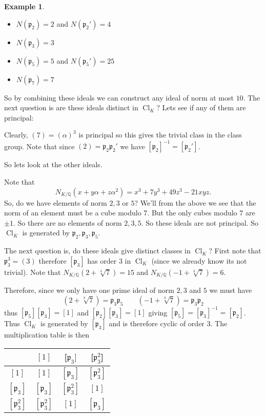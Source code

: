 \documentclass[11pt,a4paper]{report}
\theoremstyle{plain}
\theoremstyle{definition}
\newtheorem{exmp}[subsection]{Example}
\theoremstyle{definition}
\def\QQ{\mathbb{Q}}
\def\gothp{\mathfrak{p}}
\def \a{\alpha}
\DeclareMathOperator{\Cl}{Cl}
\begin{document}
\begin{exmp}
		\begin{itemize}
			\item $N(\gothp_2)=2$ and $N(\gothp_2')=4$
			\item $N(\gothp_3)=3$ 
			\item $N(\gothp_5)=5$ and $N(\gothp_5')=25$
			\item $N(\gothp_7)=7$
		\end{itemize}
		
		So by combining these ideals we can construct any ideal of norm at most $10$. The next question is are these ideals distinct in $\Cl_K$? Lets see if any of them are principal:
		
		Clearly, $(7)=(\a)^3$ is principal so this gives the trivial class in the class group. Note that since $(2)=\gothp_2\gothp_2'$ we have $[\gothp_2]^{-1}=[\gothp_2']$.
		
		So lets look at the other ideals.
		
		Note that \[N_{K/\QQ}(x+y\a+z\a^2)=x^3+7y^3+49z^3-21xyz.\] So, do we have elements of norm $2,3$ or $5$? We'll from the above we see that the norm of an element must be a cube modulo $7$. But the only cubes modulo $7$ are $\pm 1$. So there are no elements of norm $2,3,5$. So these ideals are not principal. So $\Cl_K$ is generated by $\gothp_{2},\gothp_3,\gothp_5$.
		
		The next question is, do these ideals give distinct classes in $\Cl_K$? First note that $\gothp_3^3=(3)$ therefore $[\gothp_3]$ has order $3$ in $\Cl_K$ (since we already know its not trivial). Note that $N_{K/\QQ}(2+\sqrt[3]{7})=15$ and $N_{K/\QQ}(-1+\sqrt[3]{7})=6$.
		
		Therefore, since we only have one prime ideal of norm $2,3$ and $5$ we must have \[(2+\sqrt[3]{7})=\gothp_3\gothp_5 \qquad (-1+\sqrt[3]{7})=\gothp_3\gothp_2 \] thus $[\gothp_5][\gothp_3]=[1]$ and $[\gothp_{2}][\gothp_3]=[1]$ giving $[\gothp_5]=[\gothp_3]^{-1}=[\gothp_2]$. Thus $\Cl_K$ is generated by $[\gothp_3]$ and is therefore cyclic of order $3$. The multiplication table is then
		
		
		\begin{center}
			\begin{tabu} {|c| c c c |}
				\hline
				&$[1]$&[$\gothp_3]$&[$\gothp_3^2$]\\
				\hline
				$[1]$&$[1]$&$[\gothp_3]$&$[\gothp_3^2]$\\
				$[\gothp_3]$&$[\gothp_3] $& $[\gothp_3^2]$&$[1]$\\
				$[\gothp_3^2]$&$[\gothp_3^2]$&$[1]$&$[\gothp_3]$\\
				\hline
			\end{tabu}
		\end{center}
		
		
	\end{exmp}
	
\end{document}
